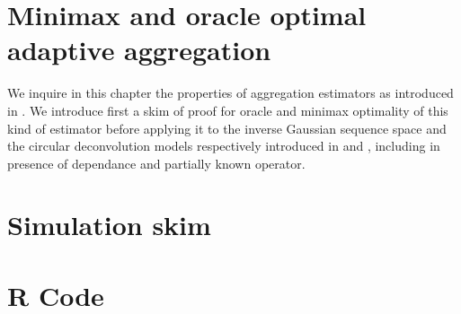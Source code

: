 \documentclass[a4paper,11pt]{book}
\begin{document}
\chapter{Minimax and oracle optimal adaptive aggregation}\label{3}
We inquire in this chapter the properties of aggregation estimators as introduced in .
We introduce first a skim of proof for oracle and minimax optimality of this kind of estimator before applying it to the inverse Gaussian sequence space and the circular deconvolution models respectively introduced in  and , including in presence of dependance and partially known operator.
%


%




%
\appendix
%
\chapter{Simulation skim}\label{A}
\chapter{R Code}\label{B}
%
{}
\nocite{*}

%
\end{document}
